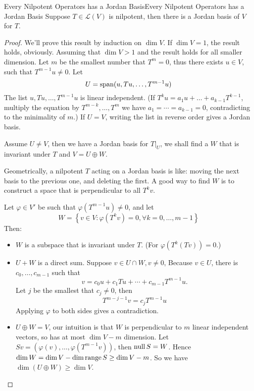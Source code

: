 \documentclass[../main.tex]{subfiles}
\begin{document}
\begin{theorem}{Every Nilpotent Operators has a Jordan Basis}{Every Nilpotent Operators has a Jordan Basis}
Suppose $T\in \mathscr{L}(V)$ is nilpotent, then there is a Jordan basis of $V$ for $T$.
\end{theorem}
\begin{proof}
	We'll prove this result by induction on $\dim V$. If $\dim V=1$, the result holds, obviously. Assuming that $\dim V>1$ and the result holds for all smaller dimension. Let  $m$ be the smallest number that $T^m=0$, thus there exists $u\in V$, such that $T^{m-1}u\neq 0$. Let
	\begin{equation*}
	U = \operatorname{span} (u,Tu, \ldots ,T^{m-1}u)
	\end{equation*}
	The list $u,Tu, \ldots ,T^{m-1}u$ is linear independent. (If $T^k u = a_1u + \ldots + a _{k-1} T^{k-1}$, multiply the equation by $T^{m-k}, \ldots ,T^m$ we have $a_1=\cdots =a _{k-1} = 0$, contradicting to the minimality of $m$.) If $U=V$, writing the list in reverse order gives a Jordan basis.

	Assume $U\neq V$, then we have a Jordan basis for $T|_U$, we shall find a $W$ that is invariant under $T$ and $V = U \oplus W$.

	Geometrically, a nilpotent $T$ acting on a Jordan basis is like: moving the next basis to the previous one, and deleting the first. A good way to find $W$ is to construct a space that is perpendicular to all $T^kv$.

	Let $\varphi\in V'$ be such that $\varphi(T^{m-1}u)\neq 0$, and let 
	\begin{equation*}
		W = \left\{ v\in V: \varphi(T^kv)=0,\forall k=0, \ldots ,m-1 \right\}
	\end{equation*}
	Then:
	\begin{itemize}
	\item $W$ is a subspace that is invariant under $T$. (For $\varphi(T^k(Tv))=0$.)
	\item $U+W$ is a direct sum. Suppose $v\in U\cap W,v\neq 0$, Because $v\in U$, there is $c_0, \ldots ,c_{m-1}$ such that
		\begin{equation*}
		v = c_0u + c_1Tu+\cdots +c_{m-1}T^{m-1}u.
		\end{equation*}
Let $j$ be the smallest that $c_j\neq 0$, then
\begin{equation*}
T^{m-j-1}v = c_j T^{m-1}u
\end{equation*}
Applying $\varphi$ to both sides gives a contradiction.
\item $U \oplus W=V$, our intuition is that $W$ is perpendicular to $m$ linear independent vectors, so has at most $\dim V-m$ dimension. Let $Sv = \left(\varphi(v), \ldots ,\varphi(T^{m-1}v)\right)$, then $\operatorname{null} S = W$. Hence $\dim W = \dim V - \dim \operatorname{range} S \geq \dim V - m$. So we have $\dim (U \oplus W) \geq \dim V$.
	\end{itemize}
\end{proof}
\end{document}
